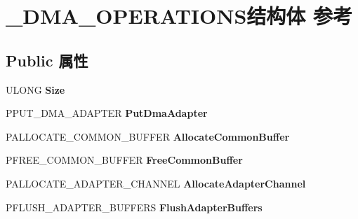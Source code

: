 \hypertarget{struct___d_m_a___o_p_e_r_a_t_i_o_n_s}{}\section{\+\_\+\+D\+M\+A\+\_\+\+O\+P\+E\+R\+A\+T\+I\+O\+N\+S结构体 参考}
\label{struct___d_m_a___o_p_e_r_a_t_i_o_n_s}
\subsection*{Public 属性}
\begin{DoxyCompactItemize}
\item 
\mbox{\label{struct___d_m_a___o_p_e_r_a_t_i_o_n_s_a19213dab6697ccda3d7ad803d5189227}} 
U\+L\+O\+NG {\bfseries Size}
\item 
\mbox{\label{struct___d_m_a___o_p_e_r_a_t_i_o_n_s_afdef5994e30b123c764356c6822556e9}} 
P\+P\+U\+T\+\_\+\+D\+M\+A\+\_\+\+A\+D\+A\+P\+T\+ER {\bfseries Put\+Dma\+Adapter}
\item 
\mbox{\label{struct___d_m_a___o_p_e_r_a_t_i_o_n_s_a56e1680abcfefcda55fc3dbe81ed3aaa}} 
P\+A\+L\+L\+O\+C\+A\+T\+E\+\_\+\+C\+O\+M\+M\+O\+N\+\_\+\+B\+U\+F\+F\+ER {\bfseries Allocate\+Common\+Buffer}
\item 
\mbox{\label{struct___d_m_a___o_p_e_r_a_t_i_o_n_s_a94389f6819f919836ceaeff290eccb37}} 
P\+F\+R\+E\+E\+\_\+\+C\+O\+M\+M\+O\+N\+\_\+\+B\+U\+F\+F\+ER {\bfseries Free\+Common\+Buffer}
\item 
\mbox{\label{struct___d_m_a___o_p_e_r_a_t_i_o_n_s_aaa9e4c4d2b958363d5e285c20b1ec9ab}} 
P\+A\+L\+L\+O\+C\+A\+T\+E\+\_\+\+A\+D\+A\+P\+T\+E\+R\+\_\+\+C\+H\+A\+N\+N\+EL {\bfseries Allocate\+Adapter\+Channel}
\item 
\mbox{\label{struct___d_m_a___o_p_e_r_a_t_i_o_n_s_ab424b771d3f53a528f1ddb8b3a3a0086}} 
P\+F\+L\+U\+S\+H\+\_\+\+A\+D\+A\+P\+T\+E\+R\+\_\+\+B\+U\+F\+F\+E\+RS {\bfseries Flush\+Adapter\+Buffers}
\item 
\mbox{\label{struct___d_m_a___o_p_e_r_a_t_i_o_n_s_a2ccea606477aa6b7cf3e367803947338}} 

\end{DoxyCompactItemize}
